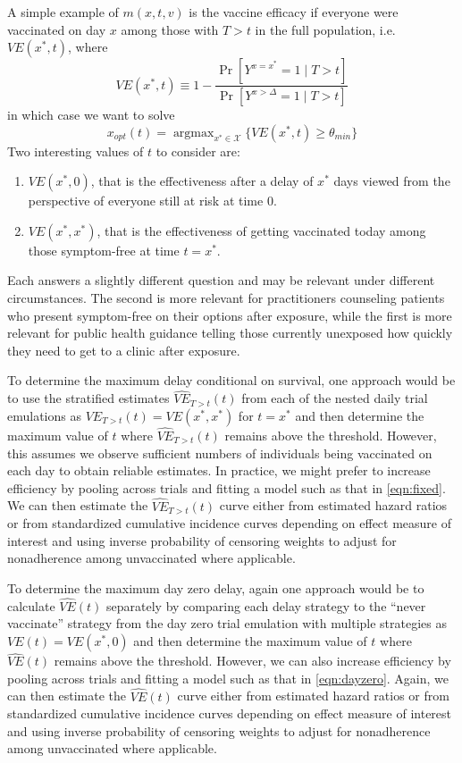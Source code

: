 \begin{appendix}
    A simple example of $m(x, t, v)$ is the vaccine efficacy if everyone were vaccinated on day $x$ among those with $T > t$ in the full population, i.e. $VE(x^*, t)$, where
    $$VE(x^*, t) \equiv 1 - \frac{\Pr[Y^{x=x^*} = 1 \mid T > t]}{\Pr[Y^{x > \Delta} = 1 \mid T > t]}$$
    in which case we want to solve  
    $$x_{opt}(t) = \operatorname{argmax}_{x^* \in \mathcal{X}} \{VE(x^*, t) \geq \theta_{min} \}$$
    Two interesting values of $t$ to consider are:
    \begin{enumerate}
        \item $VE(x^*, 0)$, that is the effectiveness after a delay of $x^*$ days viewed from the perspective of everyone still at risk at time 0. 
        \item $VE(x^*, x^*)$, that is the effectiveness of getting vaccinated today among those symptom-free at time $t = x^*$.
    \end{enumerate}
    Each answers a slightly different question and may be relevant under different circumstances. The second is more relevant for practitioners counseling patients who present symptom-free on their options after exposure, while the first is more relevant for public health guidance telling those currently unexposed how quickly they need to get to a clinic after exposure. 

    To determine the maximum delay conditional on survival, one approach would be to use the stratified estimates $\widehat{VE}_{T > t}(t)$ from each of the nested daily trial emulations as $VE_{T > t}(t) = VE(x^*, x^*)$ for $t = x^*$ and then determine the maximum value of $t$ where  $\widehat{VE}_{T > t}(t)$ remains above the threshold. However, this assumes we observe sufficient numbers of individuals being vaccinated on each day to obtain reliable estimates. In practice, we might prefer to increase efficiency by pooling across trials and fitting a model such as that in \ref{eqn:fixed}. We can then estimate the $\widehat{VE}_{T > t}(t)$ curve either from estimated hazard ratios or from standardized cumulative incidence curves depending on effect measure of interest and using inverse probability of censoring weights to adjust for nonadherence among unvaccinated where applicable.

    To determine the maximum day zero delay, again one approach would be to calculate $\widehat{VE}(t)$ separately by comparing each delay strategy to the ``never vaccinate'' strategy from the day zero trial emulation with multiple strategies as $VE(t) = VE(x^*, 0)$ and then determine the maximum value of $t$ where  $\widehat{VE}(t)$ remains above the threshold. However,  we can also increase efficiency by pooling across trials and fitting a model such as that in \ref{eqn:dayzero}. Again, we can then estimate the $\widehat{VE}(t)$ curve either from estimated hazard ratios or from standardized cumulative incidence curves depending on effect measure of interest and using inverse probability of censoring weights to adjust for nonadherence among unvaccinated where applicable.
    

\end{appendix}
